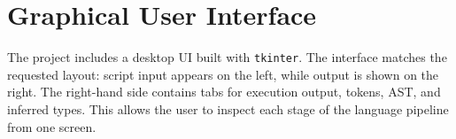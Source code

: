 \section{Graphical User Interface}
The project includes a desktop UI built with \texttt{tkinter}. The interface
matches the requested layout: script input appears on the left, while output is
shown on the right. The right-hand side contains tabs for execution output,
tokens, AST, and inferred types. This allows the user to inspect each stage of
the language pipeline from one screen.
